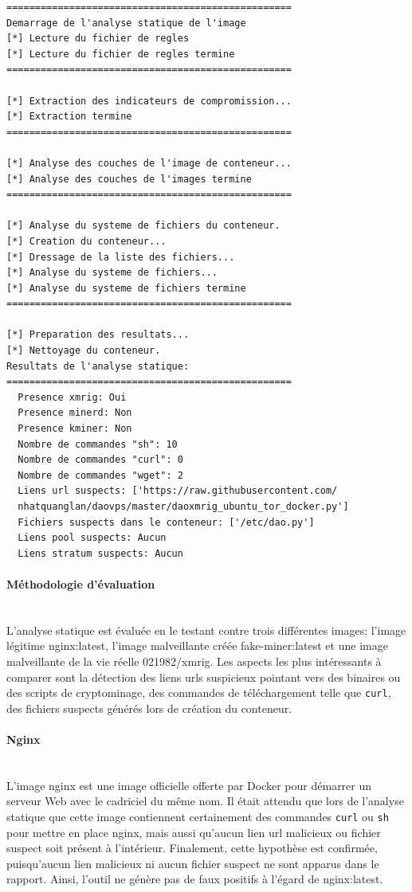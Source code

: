 \begin{lstlisting}[caption=Retour CLI 021982/xmrig:latest]
==================================================
Demarrage de l'analyse statique de l'image
[*] Lecture du fichier de regles
[*] Lecture du fichier de regles termine
==================================================

[*] Extraction des indicateurs de compromission...
[*] Extraction termine
==================================================

[*] Analyse des couches de l'image de conteneur...
[*] Analyse des couches de l'images termine
==================================================

[*] Analyse du systeme de fichiers du conteneur.
[*] Creation du conteneur...
[*] Dressage de la liste des fichiers...
[*] Analyse du systeme de fichiers...
[*] Analyse du systeme de fichiers termine
==================================================

[*] Preparation des resultats...
[*] Nettoyage du conteneur.
Resultats de l'analyse statique:
==================================================
  Presence xmrig: Oui
  Presence minerd: Non
  Presence kminer: Non
  Nombre de commandes "sh": 10
  Nombre de commandes "curl": 0
  Nombre de commandes "wget": 2
  Liens url suspects: ['https://raw.githubusercontent.com/
  nhatquanglan/daovps/master/daoxmrig_ubuntu_tor_docker.py']
  Fichiers suspects dans le conteneur: ['/etc/dao.py']
  Liens pool suspects: Aucun
  Liens stratum suspects: Aucun
\end{lstlisting}
\noindent \paragraph{Méthodologie d'évaluation} \mbox{} \\
\noindent L'analyse statique est évaluée en le testant contre trois différentes images: l'image légitime nginx:latest, l'image malveillante créée fake-miner:latest et une image malveillante de la vie réelle 021982/xmrig. Les aspects les plus intéressants à comparer sont la détection des liens urls suspicieux pointant vers des binaires ou des scripts de cryptominage, des commandes de téléchargement telle que \texttt{curl}, des fichiers suspects générés lors de création du conteneur.
\noindent \paragraph{Nginx} \mbox{} \\
\noindent L'image nginx est une image officielle offerte par Docker pour démarrer un serveur Web avec le cadriciel du même nom. Il était attendu que lors de l'analyse statique que cette image contiennent certainement des commandes \texttt{curl} ou \texttt{sh} pour mettre en place nginx, mais aussi qu'aucun lien url malicieux ou fichier suspect soit présent à l'intérieur. Finalement, cette hypothèse est confirmée, puisqu'aucun lien malicieux ni aucun fichier suspect ne sont apparus dans le rapport. Ainsi, l'outil ne génère pas de faux positifs à l'égard de nginx:latest.
